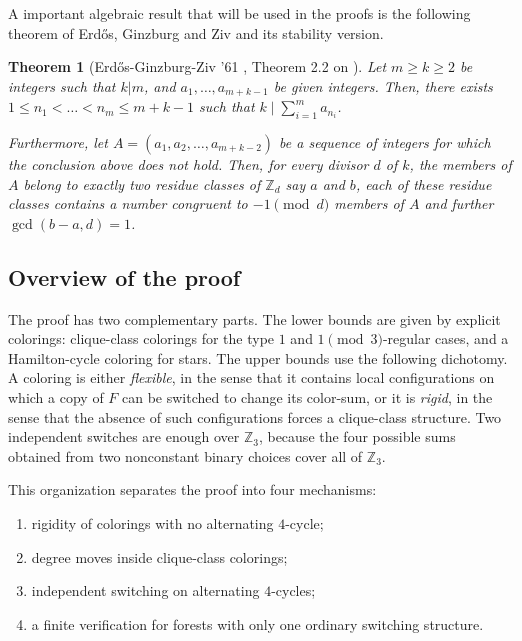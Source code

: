 \documentclass[11pt]{article}
\newtheorem{theorem}{Theorem}[section]
\newcommand{\Z}{\mathbb Z}
\begin{document}
A important algebraic result that will be used in the proofs is the following theorem of Erd\H{o}s, Ginzburg and Ziv and its stability version. 

\begin{theorem}[Erd\H{o}s-Ginzburg-Ziv '61 \cite{Erdos1961-qb}, Theorem 2.2 on \cite{caro1996zero}] \label{thm:egz}
    Let $m \geq k \geq 2$ be integers such that $k | m$, and $a_1,\dots,a_{m+k-1}$ be given integers. Then, there exists $1\leq n_1 < \dots < n_m \leq m+k-1$ such that $k \mid \sum_{i=1}^m a_{n_i}$. 
    
    Furthermore, let $A = (a_1, a_2, \dots, a_{m+k-2})$ be a sequence of integers for which the conclusion above does not hold. Then, for every divisor $d$ of $k$, the members of $A$ belong to exactly two residue classes of $\mathbb{Z}_d$ say $a$ and $b$, each of these residue classes contains a number congruent to $- 1 \pmod{d}$ members of $A$ and further $\gcd(b-a, d) = 1$.
\end{theorem}

\subsection{Overview of the proof}

The proof has two complementary parts.  The lower bounds are given by explicit colorings: clique-class colorings for the type $1$ and $1\pmod 3$-regular cases, and a Hamilton-cycle coloring for stars.  The upper bounds use the following dichotomy.  A coloring is either \emph{flexible}, in the sense that it contains local configurations on which a copy of $F$ can be switched to change its color-sum, or it is \emph{rigid}, in the sense that the absence of such configurations forces a clique-class structure.  Two independent switches are enough over $\Z_3$, because the four possible sums obtained from two nonconstant binary choices cover all of $\Z_3$.

This organization separates the proof into four mechanisms:
\begin{enumerate}[label=(\roman*),leftmargin=2.2em]

\item rigidity of colorings with no alternating $4$-cycle;
\item degree moves inside clique-class colorings;
\item independent switching on alternating $4$-cycles;
\item a finite verification for forests with only one ordinary switching structure.
\end{enumerate}
\end{document}
